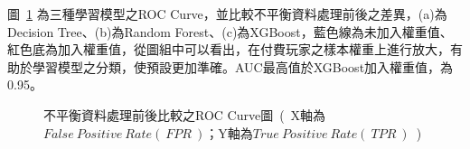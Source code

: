 圖~\ref{fig:eva_ROCCurveEvaluationImbalancedData} 為三種學習模型之ROC Curve，並比較不平衡資料處理前後之差異，(a)為Decision Tree、(b)為Random Forest、(c)為XGBoost，藍色線為未加入權重值、紅色底為加入權重值，從圖組中可以看出，在付費玩家之樣本權重上進行放大，有助於學習模型之分類，使預設更加準確。AUC最高值於XGBoost加入權重值，為0.95。

\begin{figure}[!htb]
    \centering
    \caption[不平衡資料處理前後比較之ROC Curve圖]{不平衡資料處理前後比較之ROC Curve圖\ (\ X軸為$False\ Positive\ Rate (\ FPR\ )$；Y軸為$True\ Positive\ Rate (\ TPR\ )$\ )}
    \label{fig:eva_ROCCurveEvaluationImbalancedData}
\end{figure}
\newpage

